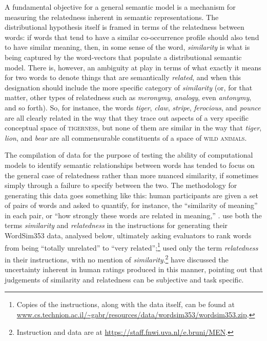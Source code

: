 A fundamental objective for a general semantic model is a mechanism for measuring the relatedness inherent in semantic representations.  The distributional hypothesis itself is framed in terms of the relatedness between words: if words that tend to have a similar co-occurrence profile should also tend to have similar meaning, then, in some sense of the word, \emph{similarity} is what is being captured by the word-vectors that populate a distributional semantic model.  There is, however, an ambiguity at play in terms of what exactly it means for two words to denote things that are semantically \emph{related}, and when this designation should include the more specific category of \emph{similarity} (or, for that matter, other types of relatedness such as \emph{meronymy}, \emph{analogy}, even \emph{antonymy}, and so forth).  So, for instance, the words \emph{tiger}, \emph{claw}, \emph{stripe}, \emph{ferocious}, and \emph{pounce} are all clearly related in the way that they trace out aspects of a very specific conceptual space of \textsc{tigerness}, but none of them are similar in the way that \emph{tiger}, \emph{lion}, and \emph{bear} are all commensurable constituents of a space of \textsc{wild animals}.

The compilation of data for the purpose of testing the ability of computational models to identify semantic relationships between words has tended to focus on the general case of relatedness rather than more nuanced similarity, if sometimes simply through a failure to specify between the two.  The methodology for generating this data goes something like this: human participants are given a set of pairs of words and asked to quantify, for instance, the ``similarity of meaning'' \citep[][p. 628]{RubensteinEA1965} in each pair, or ``how strongly these words are related in meaning,'' \citep[][p. 124]{YangEA2006}.  \cite{FinkelsteinEA2002} use both the terms \emph{similarity} and \emph{relatedness} in the instructions for generating their WordSim353 data, analysed below, ultimately asking evaluators to rank words from being ``totally unrelated'' to ``very related'';\footnote{Copies of the instructions, along with the data itself, can be found at \url{www.cs.technion.ac.il/~gabr/resources/data/wordsim353/wordsim353.zip}.} \cite{BruniEA2012} used only the term \emph{relatedness} in their instructions, with no mention of \emph{similarity}.\footnote{Instruction and data are at \url{https://staff.fnwi.uva.nl/e.bruni/MEN}.}  \cite{FaruquiEA2016} have discussed the uncertainty inherent in human ratings produced in this manner, pointing out that judgements of similarity and relatedness can be subjective and task specific.

